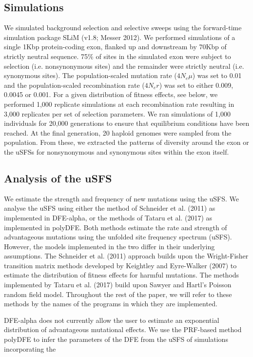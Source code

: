 \documentclass{article}
\begin{document}
	\subsection*{Simulations}
	We simulated background selection and selective sweeps using the forward-time simulation package SLiM (v1.8; Messer 2012). We performed simulations of a single 1Kbp protein-coding exon, flanked up and downstream by 70Kbp of strictly neutral sequence. 75\% of sites in the simulated exon were subject to selection (i.e. nonsynonymous sites) and the remainder were strictly neutral (i.e. synonymous sites). The population-scaled mutation rate (\emph{$4N_{e}\mu$}) was set to 0.01 and the population-scaled recombination rate (\emph{$4N_{e}r$}) was set to either 0.009, 0.0045 or 0.001. For a given distribution of fitness effects, see below, we performed 1,000 replicate simulations at each recombination rate resulting in 3,000 replicates per set of selection parameters. We ran simulations of 1,000 individuals for 20,000 generations to ensure that equilibrium conditions have been reached. At the final generation, 20 haploid genomes were sampled from the population. From these, we extracted the patterns of diversity around the exon or the uSFSs for nonsynonymous and synonymous sites within the exon itself.


	\subsection*{Analysis of the uSFS}

	We estimate the strength and frequency of new mutations using the uSFS. We analyse the uSFS using either the method of Schneider et al. (2011) as implemented in DFE-alpha, or the methods of Tataru et al. (2017) as implemented in polyDFE. Both methods estimate the rate and strength of advantageous mutations using the unfolded site frequency spectrum (uSFS). However, the models implemented in the two differ in their underlying assumptions. The Schneider et al. (2011) approach builds upon the Wright-Fisher transition matrix methods developed by Keightley and Eyre-Walker (2007) to estimate the distribution of fitness effects for harmful mutations. The methods implemented by Tataru et al. (2017) build upon Sawyer and Hartl’s Poisson random field model.
Throughout the rest of the paper, we will refer to these methods by the names of the programs in which they are implemented.

DFE-alpha does not currently allow the user to estimate an exponential distribution of advantageous mutational effects. We use the PRF-based method polyDFE to infer the parameters of the DFE from the uSFS of simulations incorporating the 
\end{document}

